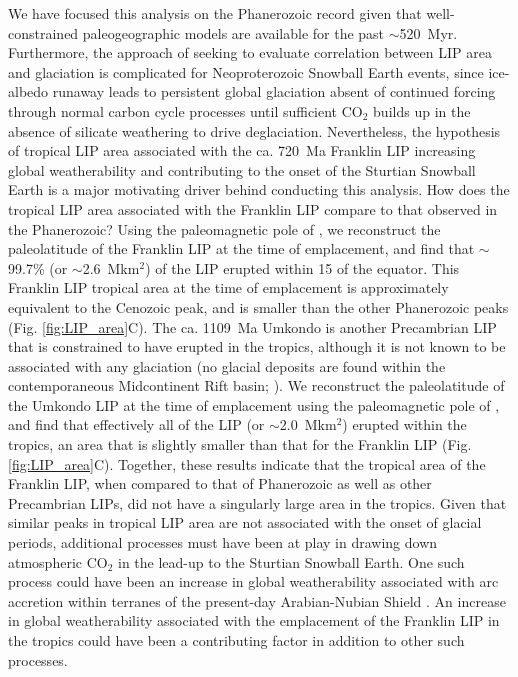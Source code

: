 \documentclass[11pt,letterpaper]{article}
\begin{document}
We have focused this analysis on the Phanerozoic record given that well-constrained paleogeographic models are available for the past $\sim$520~Myr. Furthermore, the approach of seeking to evaluate correlation between LIP area and glaciation is complicated for Neoproterozoic Snowball Earth events, since ice-albedo runaway leads to persistent global glaciation absent of continued forcing through normal carbon cycle processes until sufficient CO$_2$ builds up in the absence of silicate weathering to drive deglaciation. Nevertheless, the hypothesis of tropical LIP area associated with the ca. 720~Ma Franklin LIP increasing global weatherability and contributing to the onset of the Sturtian Snowball Earth is a major motivating driver behind conducting this analysis. How does the tropical LIP area associated with the Franklin LIP compare to that observed in the Phanerozoic? Using the paleomagnetic pole of \citet{Denyszyn2009a}, we reconstruct the paleolatitude of the Franklin LIP at the time of emplacement, and find that $\sim$99.7\% (or $\sim$2.6~Mkm$^{2}$) of the LIP erupted within 15\textdegree\xspace of the equator. This Franklin LIP tropical area at the time of emplacement is approximately equivalent to the Cenozoic peak, and is smaller than the other Phanerozoic peaks (Fig. \ref{fig:LIP_area}C). The ca. 1109~Ma Umkondo is another Precambrian LIP that is constrained to have erupted in the tropics, although it is not known to be associated with any glaciation (no glacial deposits are found within the contemporaneous Midcontinent Rift basin; \citealp{Swanson-Hysell2018a}). We reconstruct the paleolatitude of the Umkondo LIP at the time of emplacement using the paleomagnetic pole of \citet{Swanson-Hysell2015b}, and find that effectively all of the LIP (or $\sim$2.0~Mkm$^{2}$) erupted within the tropics, an area that is slightly smaller than that for the Franklin LIP (Fig. \ref{fig:LIP_area}C). Together, these results indicate that the tropical area of the Franklin LIP, when compared to that of Phanerozoic as well as other Precambrian LIPs, did not have a singularly large area in the tropics. Given that similar peaks in tropical LIP area are not associated with the onset of glacial periods, additional processes must have been at play in drawing down atmospheric CO$_2$ in the lead-up to the Sturtian Snowball Earth. One such process could have been an increase in global weatherability associated with arc accretion within terranes of the present-day Arabian-Nubian Shield \citep{Park2018a}. An increase in global weatherability associated with the emplacement of the Franklin LIP in the tropics could have been a contributing factor in addition to other such processes.
\end{document}
